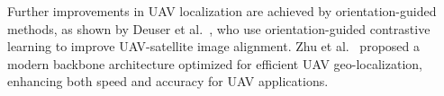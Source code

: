 Further improvements in UAV localization are achieved by orientation-guided methods, as shown by Deuser et al.~\cite{Deuser_2023_ogcl_uav_view}, who use orientation-guided contrastive learning to improve UAV-satellite image alignment. Zhu et al.~\cite{Zhu_2023_uav_backbone_winnerUAV_mbeg} proposed a modern backbone architecture optimized for efficient UAV geo-localization, enhancing both speed and accuracy for UAV applications.
